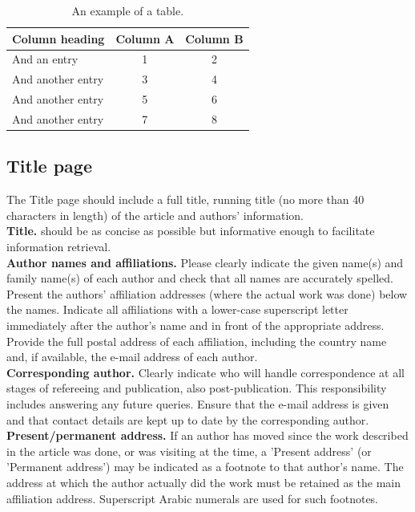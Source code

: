 \documentclass[final,3p,times,twocolumn]{elsarticle}
\begin{document}
\begin{table}[]
\centering
\caption{An example of a table.}
\begin{tabular}{@{}lcc@{}}
\toprule
Column heading & Column A & Column B \\ \midrule
And an entry                   & 1        & 2        \\
And another entry              & 3        & 4        \\
And another entry              & 5        & 6        \\
And another entry              & 7        & 8        \\ \bottomrule
\end{tabular}
\label{tab:ex}
\end{table}

\subsection{Title page}

The Title page should include a full title, running title (no more than 40 characters in length) of the article and authors' information. \\

\textbf{Title. }should be as concise as possible but informative enough to facilitate information retrieval.\\

\textbf{Author names and affiliations. }Please clearly indicate the given name(s) and family name(s) of each author and check that all names are accurately spelled. 
Present the authors' affiliation addresses (where the actual work was done) below the names. 
Indicate all affiliations with a lower-case superscript letter immediately after the author's name and in front of the appropriate address. 
Provide the full postal address of each affiliation, including the country name and, if available, the e-mail address of each author.\\

\textbf{Corresponding author. }Clearly indicate who will handle correspondence at all stages of refereeing and publication, also post-publication. 
This responsibility includes answering any future queries. 
Ensure that the e-mail address is given and that contact details are kept up to date by the corresponding author.\\

\textbf{Present/permanent address. }If an author has moved since the work described in the article was done, or was visiting at the time, a 'Present address' (or 'Permanent address') may be indicated as a footnote to that author's name. 
The address at which the author actually did the work must be retained as the main affiliation address. 
Superscript Arabic numerals are used for such footnotes.
\end{document}
